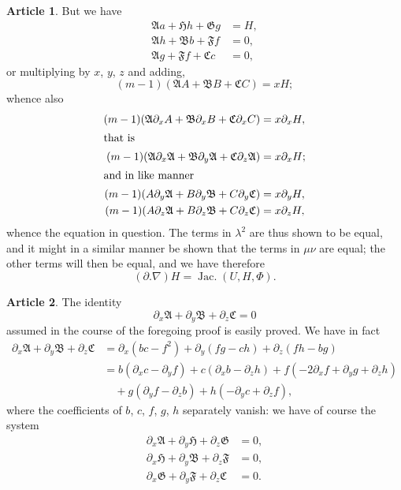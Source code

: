 \documentclass[11pt,a4paper]{article}
\theoremstyle{definition}
\newtheorem{art}{Article}[section]
\DeclareMathOperator{\Jac}{Jac.}
\newcommand{\fA}{\mathfrak{A}}
\newcommand{\fB}{\mathfrak{B}}
\newcommand{\fC}{\mathfrak{C}}
\newcommand{\fF}{\mathfrak{F}}
\newcommand{\fG}{\mathfrak{G}}
\newcommand{\fH}{\mathfrak{H}}
\begin{document}
\setcounter{art}{38}
\begin{art}
But we have
\begin{align*}
\fA a + \fH h + \fG g &= H, \\
\fA h + \fB b + \fF f &= 0, \\
\fA g + \fF f + \fC c &= 0,
\end{align*}
or multiplying by $x$, $y$, $z$ and adding,
\[
(m-1)(\fA A + \fB B + \fC C) = xH;
\]
whence also
\begin{align*}
(m-1)(\fA \partial_x A + \fB \partial_x B + \fC \partial_x C) &= x\partial_x H, \\
\intertext{that is}
(m-1)(\fA \partial_x \fA + \fB \partial_y \fA + \fC \partial_z \fA) &= x\partial_x H; \\
\intertext{and in like manner}
(m-1)(A \partial_y \fA + B \partial_y \fB + C \partial_y \fC) &= x\partial_y H, \\
(m-1)(A \partial_z \fA + B \partial_z \fB + C \partial_z \fC) &= x\partial_z H,
\end{align*}
whence the equation in question. The terms in $\lambda^2$ are thus shown to be equal, and
it might in a similar manner be shown that the terms in $\mu\nu$ are equal; the other
terms will then be equal, and we have therefore
\[
(\partial . \nabla)H = \Jac(U, H, \Phi).
\]
\end{art}

\setcounter{art}{39}
\begin{art}
The identity
\[
\partial_x \fA + \partial_y \fB + \partial_z \fC = 0
\]
assumed in the course of the foregoing proof is easily proved. We have in fact
\begin{align*}
\partial_x \fA + \partial_y \fB + \partial_z \fC
&= \partial_x(bc-f^2) + \partial_y(fg-ch) + \partial_z(fh-bg) \\
&= b(\partial_x c - \partial_y f) + c(\partial_x b - \partial_z h)
+ f(-2\partial_x f + \partial_y g + \partial_z h) \\
&\quad + g(\partial_y f - \partial_z b) + h(-\partial_y c + \partial_z f),
\end{align*}
where the coefficients of $b$, $c$, $f$, $g$, $h$ separately vanish: we have of course the system
\begin{align*}
\partial_x \fA + \partial_y \fH + \partial_z \fG &= 0, \\
\partial_x \fH + \partial_y \fB + \partial_z \fF &= 0, \\
\partial_x \fG + \partial_y \fF + \partial_z \fC &= 0.
\end{align*}
\end{art}
\end{document}

